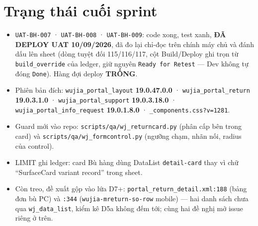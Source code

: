 \section{Trạng thái cuối sprint}

\begin{itemize}
\item \texttt{UAT-BH-007} · \texttt{UAT-BH-008} · \texttt{UAT-BH-009}: code xong, test xanh,
  \textbf{ĐÃ DEPLOY UAT 10/09/2026}, đã đo lại chỉ-đọc trên chính máy chủ và đánh dấu lên sheet
  (dòng tuyệt đối 115/116/117, cột Build/Deploy ghi trọn từ \texttt{build\_override} của ledger,
  giữ nguyên \texttt{Ready for Retest} --- Dev không tự đóng \texttt{Done}). Hàng đợi deploy
  \textbf{TRỐNG}.
\item Phiên bản đích: \texttt{wujia\_portal\_layout} \textbf{19.0.47.0.0} ·
  \texttt{wujia\_portal\_return} \textbf{19.0.3.1.0} · \texttt{wujia\_portal\_support}
  \textbf{19.0.3.18.0} · \texttt{wujia\_portal\_info\_request} \textbf{19.0.1.8.0} ·
  \texttt{\_components.css?v=1281}.
\item Guard mới vào repo: \texttt{scripts/qa/wj\_returncard.py} (phân cấp bên trong card) và
  \texttt{scripts/qa/wj\_formcontrol.py} (ngưỡng chạm, nhãn nối, radius của control).
\item LIMIT ghi ledger: card Bù hàng dùng DataList \texttt{detail-card} thay vì chữ ``SurfaceCard
  variant record'' trong sheet.
\item Còn treo, đề xuất gộp vào lứa D7+: \texttt{portal\_return\_detail.xml:188} (bảng đơn bù PC)
  và \texttt{:344} (\texttt{wujia-mreturn-so-row} mobile) --- hai danh sách chưa qua
  \texttt{wj\_data\_list}, kiểm kê D5a không đếm tới; cùng hai đề nghị mở issue riêng ở trên.
\end{itemize}
